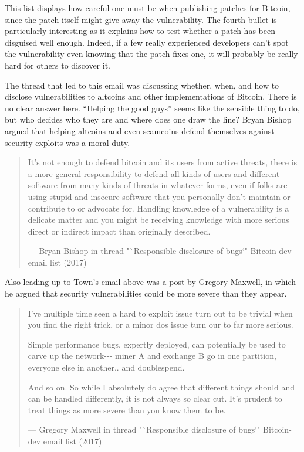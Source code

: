 This list displays how careful one must be when publishing patches for
Bitcoin, since the patch itself might give away the vulnerability. The
fourth bullet is particularly interesting as it explains how to test
whether a patch has been disguised well enough. Indeed, if a few really
experienced developers can't spot the vulnerability even knowing that
the patch fixes one, it will probably be really hard for others to
discover it.

The thread that led to this email was discussing whether, when, and how
to disclose vulnerabilities to altcoins and other implementations of
Bitcoin. There is no clear answer here. ``Helping the good guys'' seems
like the sensible thing to do, but who decides who they are and where
does one draw the line? Bryan Bishop
\href{https://lists.linuxfoundation.org/pipermail/bitcoin-dev/2017-September/014983.html}{argued}
that helping altcoins and even scamcoins defend themselves against
security exploits was a moral duty.

\begin{quote}
It's not enough to defend bitcoin and its users from active threats,
there is a more general responsibility to defend all kinds of users and
different software from many kinds of threats in whatever forms, even if
folks are using stupid and insecure software that you personally don't
maintain or contribute to or advocate for. Handling knowledge of a
vulnerability is a delicate matter and you might be receiving knowledge
with more serious direct or indirect impact than originally described.

---  Bryan Bishop in thread "`Responsible disclosure of bugs`"
Bitcoin-dev email list (2017)
\end{quote}

Also leading up to Town's email above was a
\href{https://lists.linuxfoundation.org/pipermail/bitcoin-dev/2017-September/014977.html}{post}
by Gregory Maxwell, in which he argued that security vulnerabilities
could be more severe than they appear.

\begin{quote}
I've multiple time seen a hard to exploit issue turn out to be trivial
when you find the right trick, or a minor dos issue turn our to far more
serious.

Simple performance bugs, expertly deployed, can potentially be used to
carve up the network-\/-\/- miner A and exchange B go in one partition,
everyone else in another.. and doublespend.

And so on. So while I absolutely do agree that different things should
and can be handled differently, it is not always so clear cut. It's
prudent to treat things as more severe than you know them to be.

---  Gregory Maxwell in thread "`Responsible disclosure of bugs`"
Bitcoin-dev email list (2017)
\end{quote}

